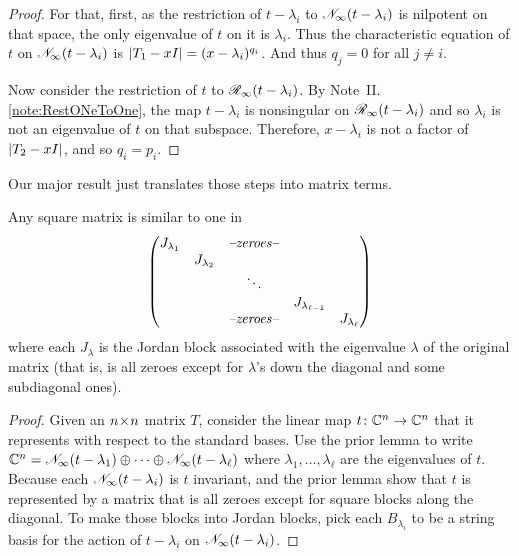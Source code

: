 \begin{proof}
For that, first,
as the restriction of \( t-\lambda_i \) to \( \mathscr{N}_\infty(t-\lambda_i) \)
is nilpotent on that space,
the only eigenvalue of \( t \) on it is \( \lambda_i \).
Thus the characteristic equation of \( t \) on
\( \mathscr{N}_\infty(t-\lambda_i) \) is
\( \deter{T_1-xI}=(x-\lambda_i)^{q_i} \).
And thus $q_j=0$ for all $j\neq i$.

Now consider the restriction of \( t \) to \( \mathscr{R}_\infty(t-\lambda_i) \).
By Note~II.\ref{note:RestONeToOne}, the map
\( t-\lambda_i \) is nonsingular on
\( \mathscr{R}_\infty(t-\lambda_i) \) and so \( \lambda_i \) is not an
eigenvalue of \( t \) on that subspace.
Therefore, \( x-\lambda_i \) is not a factor of \( \deter{T_2-xI} \),
and so \( q_i=p_i \).
\end{proof}

Our major result just
translates those steps into matrix terms.

\begin{theorem}
Any square matrix is similar to one in 
\begin{equation*}
  \begin{pmatrix}
    J_{\lambda_1}  &     &\text{\textit{--zeroes--}}                 \\
         &J_{\lambda_2}                                              \\
         &     &\ddots                                     \\
         &     &                           &J_{\lambda_{\ell-1}}     \\
         &     &\text{\textit{--zeroes--}} &  &J_{\lambda_{\ell}}
  \end{pmatrix}
\end{equation*}
where each \( J_{\lambda} \) is the Jordan block associated with the
eigenvalue $\lambda$ of the original matrix (that is, is all zeroes except for
\( \lambda \)'s down the diagonal and some subdiagonal ones).
\end{theorem}

\begin{proof}
Given an \( n \! \times \! n \) matrix \( T \), consider the linear map
\( \mbox{$t\colon \mathbb{C}^n\to \mathbb{C}^n$} \) that it represents
with respect to the standard bases.
Use the prior lemma to write
\( \mathbb{C}^n=\mathscr{N}_\infty(t-\lambda_1)\oplus\cdots
        \oplus\mathscr{N}_\infty(t-\lambda_\ell) \)
where \( \lambda_1,\ldots,\lambda_\ell \) are the eigenvalues of \( t \).
Because each \( \mathscr{N}_\infty(t-\lambda_i) \)  is \( t \) invariant,
 and the prior lemma show
that \( t \) is represented by a matrix that is all zeroes except for square
blocks along the diagonal.
To make those blocks into Jordan blocks, pick each \( B_{\lambda_i} \)
to be a string basis for the action of \( t-\lambda_i \) on
\( \mathscr{N}_\infty(t-\lambda_i) \). 
\end{proof}

